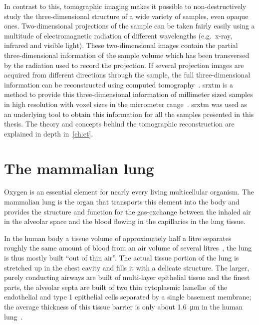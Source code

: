 In contrast to this, tomographic imaging makes it possible to non-destructively study the three-dimensional structure of a wide variety of samples, even opaque ones. Two-dimensional projections of the sample can be taken fairly easily using a multitude of electromagnetic radiation of different wavelengths (e.g.\ x-ray, infrared and visible light). These two-dimensional images contain the partial three-dimensional information of the sample volume which has been transversed by the radiation used to record the projection. If several projection images are acquired from different directions through the sample, the full three-dimensional information can be reconstructed using computed tomography~\cite{Hounsfield1976a}. \acf{srxtm} is a method to provide this three-dimensional information of millimeter sized samples in high resolution with voxel sizes in the micrometer range~\cite{Bonse2008}. \ac{srxtm} was used as an underlying tool to obtain this information for all the samples presented in this thesis. The theory and concepts behind the tomographic reconstruction are explained in depth in~\autoref{ch:ct}.

\section{The mammalian lung}
Oxygen is an essential element for nearly every living multicellular organism. The mammalian lung is the organ that transports this element into the body and provides the structure and function for the gas-exchange between the inhaled air in the alveolar space and the blood flowing in the capillaries in the lung tissue.

In the human body a tissue volume of approximately half a litre separates roughly the same amount of blood from an air volume of several litres~\cite{Weibel2009}, the lung is thus mostly built ``out of thin air''. The actual tissue portion of the lung is stretched up in the chest cavity and fills it with a delicate structure. The larger, purely conducting airways are built of multi-layer epithelial tissue and the finest parts, the alveolar septa are built of two thin cytoplasmic lamell\ae\ of the endothelial and type 1 epithelial cells separated by a single basement membrane; the average thickness of this tissue barrier is only about \SI{1.6}{\micro\meter} in the human lung~\cite{Weibel2009}.

